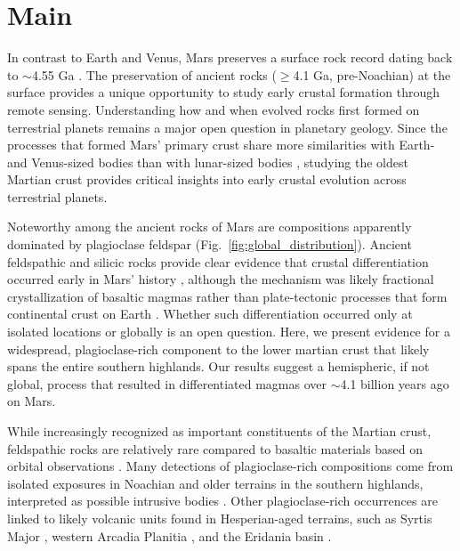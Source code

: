 \documentclass[12pt]{article}
\begin{document}
\section*{Main}

In contrast to Earth and Venus, Mars preserves a surface rock record dating back to $\sim$4.55 Ga \citep{Humayun2013, Kruijer2020}. The preservation of ancient rocks ($\geq$4.1 Ga, pre-Noachian) at the surface provides a unique opportunity to study early crustal formation through remote sensing. Understanding how and when evolved rocks first formed on terrestrial planets remains a major open question in planetary geology. Since the processes that formed Mars' primary crust share more similarities with Earth- and Venus-sized bodies than with lunar-sized bodies \citep{Elkins-Tanton2012}, studying the oldest Martian crust provides critical insights into early crustal evolution across terrestrial planets.

Noteworthy among the ancient rocks of Mars are compositions apparently dominated by plagioclase feldspar (Fig.~\ref{fig:global_distribution}). Ancient feldspathic and silicic rocks provide clear evidence that crustal differentiation occurred early in Mars' history \citep[e.g.,][]{Stolper2013, Sautter2015}, although the mechanism was likely fractional crystallization of basaltic magmas rather than plate-tectonic processes that form continental crust on Earth \citep{Udry2018}. Whether such differentiation occurred only at isolated locations or globally is an open question. Here, we present evidence for a widespread, plagioclase-rich component to the lower martian crust that likely spans the entire southern highlands. Our results suggest a hemispheric, if not global, process that resulted in differentiated magmas over $\sim$4.1 billion years ago on Mars.

While increasingly recognized as important constituents of the Martian crust, feldspathic rocks are relatively rare compared to basaltic materials based on orbital observations \citep{McSween2009, McSween2015, McSween2023}. Many detections of plagioclase-rich compositions come from isolated exposures in Noachian and older terrains in the southern highlands, interpreted as possible intrusive bodies \citep{Quantin2012, Carter2013, Wray2013, Sautter2016, Payre2022}. Other plagioclase-rich occurrences are linked to likely volcanic units found in Hesperian-aged terrains, such as Syrtis Major \citep{Eggers2021}, western Arcadia Planitia \citep{Farrand2021, Rogers2022}, and the Eridania basin \citep{Michalski2023}.
\end{document}
